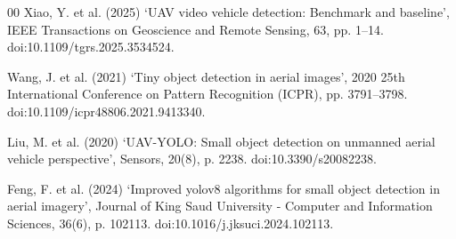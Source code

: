 \documentclass[conference]{IEEEtran}
\begin{document}
\balance
\begin{thebibliography}{00}
Xiao, Y. et al. (2025) ‘UAV video vehicle detection: Benchmark and baseline’, IEEE Transactions on Geoscience and Remote Sensing, 63, pp. 1–14. doi:10.1109/tgrs.2025.3534524.

Wang, J. et al. (2021) ‘Tiny object detection in aerial images’, 2020 25th International Conference on Pattern Recognition (ICPR), pp. 3791–3798. doi:10.1109/icpr48806.2021.9413340. 

Liu, M. et al. (2020) ‘UAV-YOLO: Small object detection on unmanned aerial vehicle perspective’, Sensors, 20(8), p. 2238. doi:10.3390/s20082238. 

Feng, F. et al. (2024) ‘Improved yolov8 algorithms for small object detection in aerial imagery’, Journal of King Saud University - Computer and Information Sciences, 36(6), p. 102113. doi:10.1016/j.jksuci.2024.102113.

\end{thebibliography}
\end{document}
